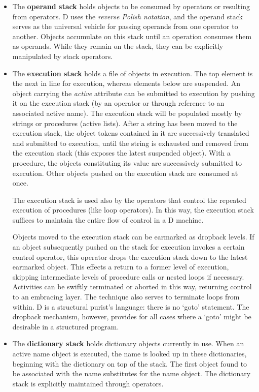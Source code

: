 \begin{itemize}
\item The \textbf{operand stack} holds objects to be consumed by operators or resulting from operators. D uses the \emph{reverse Polish notation}, and the operand stack serves as the universal vehicle for passing operands from one operator to another.  Objects  accumulate on this stack until an operation consumes them as operands.  While they remain on the stack,  they can  be explicitly manipulated by stack operators.

\item The  \textbf{execution  stack}  holds a file of objects  in  execution.  The  top element  is the next in line for execution,  whereas elements  below  are suspended.  An  object carrying the \emph{active} attribute can be submitted  to execution by pushing it on the execution stack (by an operator or through reference  to  an associated active name).  The execution stack  will  be populated mostly by strings or procedures (active lists).  After a string has been moved to the execution stack,  the object tokens contained in it are successively translated and submitted to execution,  until the string is  exhausted  and  removed from the execution stack  (this  exposes  the latest suspended object).  With a procedure, the objects constituting its value  are successively submitted to execution.  Other objects pushed  on the execution stack are consumed at once.

The  execution  stack  is used also by the operators  that  control  the repeated  execution  of procedures (like loop operators).  In  this  way,  the execution  stack suffices to maintain the entire flow of control in  a  D machine.

Objects  moved  to  the execution stack can  be  earmarked  as  dropback levels.  If  an  object subsequently pushed on the  stack  for  execution invokes  a certain control operator,  this operator drops  the  execution stack  down to the latest earmarked object.  This effects a return  to  a former  level  of execution,  skipping intermediate levels  of  procedure calls or nested loops if necessary.  Activities can be swiftly terminated or  aborted in this way,  returning control to an  embracing  layer.  The technique also serves to terminate loops from within.  D is a  structural purist's language:  there is no `goto' statement. The dropback mechanism, however,  provides  for all cases where a `goto' might be desirable in  a structured program.

\item The \textbf{dictionary stack} holds dictionary objects currently in use.  When  an active  name  object  is  executed,  the  name  is  looked  up  in  these dictionaries,  beginning  with the dictionary on top of  the  stack.  The first  object  found to be associated with the name substitutes  for  the name  object.  The  dictionary  stack is  explicitly  maintained  through operators.


\end{itemize}
